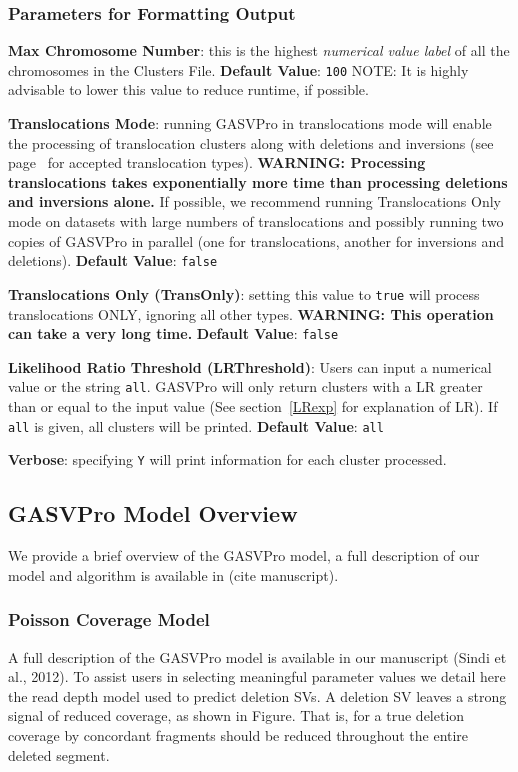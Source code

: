 \documentclass[11pt]{article}
\begin{document}
\subsubsection{Parameters for Formatting Output}
\begin{description}
\item{\bf Max Chromosome Number}:  this is the highest {\em numerical value label} of all the chromosomes in the Clusters File. {\bf Default Value}: \verb+100+ {\scriptsize NOTE: It is highly advisable to lower this value to reduce runtime, if possible.}
\item {\bf Translocations Mode}: running GASVPro in translocations mode will enable the processing of translocation clusters along with deletions and inversions (see page~\pageref{structvartypes} for accepted translocation types). {\bf WARNING: Processing translocations takes exponentially more time than processing deletions and inversions alone.} If possible, we recommend running Translocations Only mode on datasets with large numbers of translocations and possibly running two copies of GASVPro in parallel (one for translocations, another for inversions and deletions). {\bf Default Value}: \verb+false+

\item {\bf Translocations Only (TransOnly)}: setting this value to \verb+true+ will process translocations ONLY, ignoring all other types. {\bf WARNING: This operation can take a very long time.} {\bf Default Value}: \verb+false+
\item {\bf Likelihood Ratio Threshold (LRThreshold)}: Users can input a numerical value or the string \verb+all+. GASVPro will only return clusters with a LR greater than or equal to the input value (See section~\ref{LRexp} for explanation of LR). If \verb+all+ is given, all clusters will be printed. {\bf Default Value}: \verb+all+
\item {\bf Verbose}: specifying \verb+Y+ will print information for each cluster processed. 
\end{description}

\subsection{GASVPro Model Overview}
\label{sec:modeloverview}

We provide a brief overview of the GASVPro model, a full description of our model and algorithm is available in (cite manuscript).

\subsubsection{Poisson Coverage Model}
 A full description of the GASVPro model is available in our manuscript (Sindi et al., 2012). To assist users in selecting meaningful parameter values we detail here the read depth model used to predict deletion SVs.  A deletion SV leaves a strong signal of reduced coverage, as shown in Figure. That is, for a true deletion coverage by concordant fragments should be reduced throughout the entire deleted segment. 
 
\end{document}
